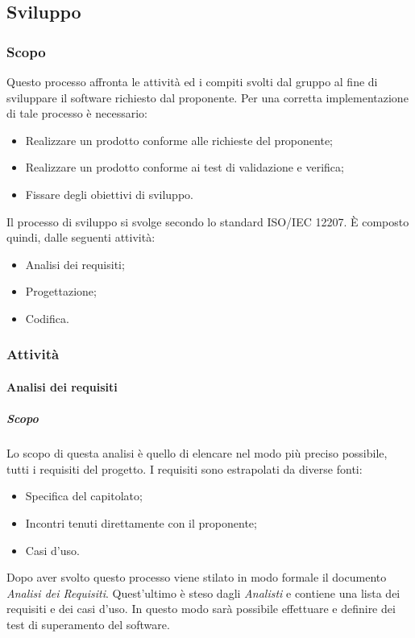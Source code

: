 \subsection{Sviluppo}
	\subsubsection{Scopo}
	Questo processo affronta le attività ed i compiti svolti dal gruppo al fine di sviluppare il software richiesto dal proponente. Per una corretta implementazione di tale processo è necessario:
	\begin{itemize}
		\item Realizzare un prodotto conforme alle richieste del proponente;
		\item Realizzare un prodotto conforme ai test di validazione e verifica;
		\item Fissare degli obiettivi di sviluppo.
	\end{itemize}
     Il processo di sviluppo si svolge secondo lo standard ISO/IEC 12207. È composto quindi, dalle seguenti attività:
     	\begin{itemize}
     	\item Analisi dei requisiti;
     	\item Progettazione;
     	\item Codifica.
     \end{itemize}
     
	

	\subsubsection{Attività}
		\paragraph{Analisi dei requisiti}
			\subparagraph{Scopo} \Spazio
			Lo scopo di questa analisi è quello di elencare nel modo più preciso possibile, tutti i requisiti del progetto. 
			I requisiti sono estrapolati da diverse fonti:
				\begin{itemize}
				\item Specifica del capitolato;
				\item Incontri tenuti direttamente con il proponente;
				\item Casi d'uso.
			\end{itemize}
		    Dopo aver svolto questo processo viene stilato in modo formale il documento \textit{Analisi dei Requisiti}.
		    Quest'ultimo è steso dagli \emph{Analisti} e contiene una lista dei requisiti e dei casi d'uso.
		    In questo modo sarà possibile effettuare e definire dei test di superamento del software. 

